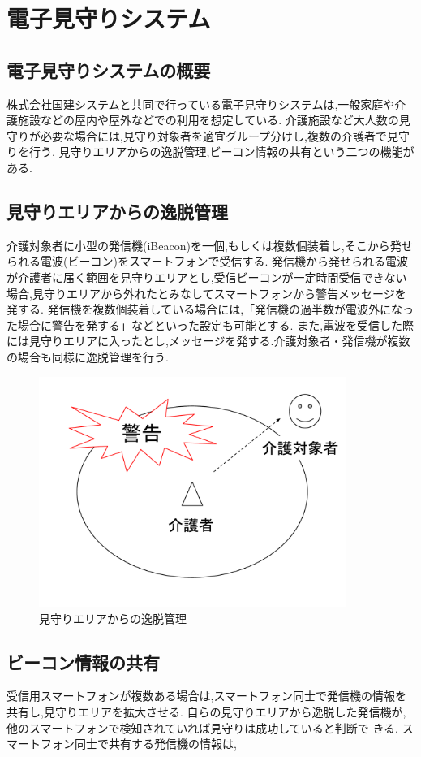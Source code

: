 \chapter{電子見守りシステム}
\label{chap:poordirection}

\section{電子見守りシステムの概要}
株式会社国建システムと共同で行っている電子見守りシステムは,一般家庭や介護施設などの屋内や屋外などでの利用を想定している.
介護施設など大人数の見守りが必要な場合には,見守り対象者を適宜グループ分けし,複数の介護者で見守りを行う.
見守りエリアからの逸脱管理,ビーコン情報の共有という二つの機能がある.

\section{見守りエリアからの逸脱管理}
介護対象者に小型の発信機(iBeacon)を一個,もしくは複数個装着し,そこから発せられる電波(ビーコン)をスマートフォンで受信する.
発信機から発せられる電波が介護者に届く範囲を見守りエリアとし,受信ビーコンが一定時間受信できない場合,見守りエリアから外れたとみなしてスマートフォンから警告メッセージを発する.
発信機を複数個装着している場合には,「発信機の過半数が電波外になった場合に警告を発する」などといった設定も可能とする.
また,電波を受信した際には見守りエリアに入ったとし,メッセージを発する.介護対象者・発信機が複数の場合も同様に逸脱管理を行う.

\begin{figure}[htbp]
\centering
\includegraphics[width=10cm]{fig/deviation.pdf}
\caption{見守りエリアからの逸脱管理}
\end{figure}

\section{ビーコン情報の共有}
受信用スマートフォンが複数ある場合は,スマートフォン同士で発信機の情報を共有し,見守りエリアを拡大させる.
自らの見守りエリアから逸脱した発信機が,他のスマートフォンで検知されていれば見守りは成功していると判断で
きる.
スマートフォン同士で共有する発信機の情報は,

